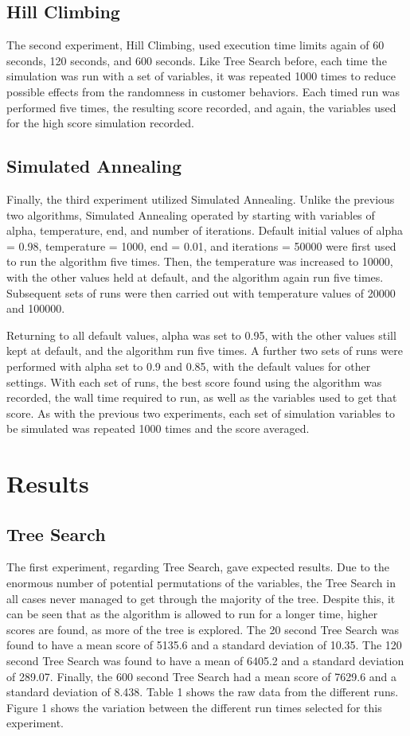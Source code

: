 \documentclass[10pt, twocolumn]{article}
\begin{document}
\subsection{Hill Climbing}
The second experiment, Hill Climbing, used execution time limits again of 60 seconds, 120 seconds,
and 600 seconds. Like Tree Search before, each time the simulation was run with a set of variables,
it was repeated 1000 times to reduce possible effects from the randomness in customer behaviors. Each
timed run was performed five times, the resulting score recorded, and again, the variables used
for the high score simulation recorded.

\subsection{Simulated Annealing}
Finally, the third experiment utilized Simulated Annealing. Unlike the previous
two algorithms, Simulated Annealing operated by starting with variables of alpha,
temperature, end, and number of iterations. Default initial values of alpha = 0.98,
temperature = 1000, end = 0.01, and iterations = 50000 were first used to run
the algorithm five times. Then, the temperature was increased to 10000, with the
other values held at default, and the algorithm again run five times. Subsequent
sets of runs were then carried out with temperature values of 20000 and 100000.

Returning to all default values, alpha was set to 0.95, with the other values still
kept at default, and the algorithm run five times. A further two sets of runs were
performed with alpha set to 0.9 and 0.85, with the default values for other settings.
With each set of runs, the best score found using the algorithm was recorded,
the wall time required to run, as well as the variables used to get that score. As with the previous
two experiments, each set of simulation variables to be simulated was repeated 1000 times
and the score averaged.

\section{Results}
\subsection{Tree Search}
The first experiment, regarding Tree Search, gave expected results. Due to the enormous
number of potential permutations of the variables, the Tree Search in all cases never
managed to get through the majority of the tree. Despite this, it can be seen that as the algorithm
is allowed to run for a longer time, higher scores are found, as more of the tree is explored. The 20 second
Tree Search was found to have a mean score of 5135.6 and a standard deviation of 10.35. The 120 second Tree Search
was found to have a mean of 6405.2 and a standard deviation of 289.07. Finally, the 600 second
Tree Search had a mean score of 7629.6 and a standard deviation of 8.438. Table 1 shows
the raw data from the different runs. Figure 1 shows the
variation between the different run times selected for this experiment.
\end{document}
